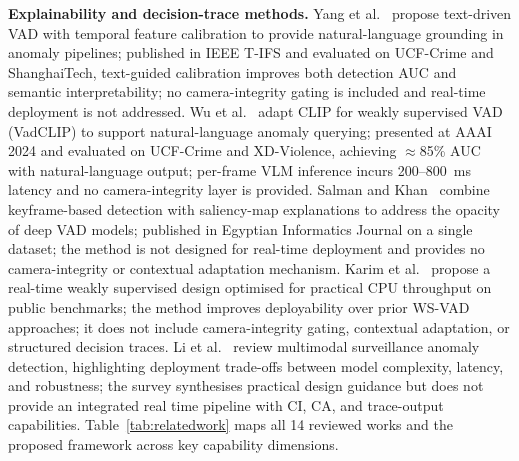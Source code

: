 \documentclass[a4paper,fleqn]{cas-dc}
\begin{document}
\textbf{Explainability and decision-trace methods.}
Yang et al.~\citep{yang2024textvad} propose text-driven VAD with temporal feature calibration to provide natural-language grounding in anomaly pipelines; published in IEEE T-IFS and evaluated on UCF-Crime and ShanghaiTech, text-guided calibration improves both detection AUC and semantic interpretability; no camera-integrity gating is included and real-time deployment is not addressed.
Wu et al.~\citep{wu2024vadclip} adapt CLIP for weakly supervised VAD (VadCLIP) to support natural-language anomaly querying; presented at AAAI 2024 and evaluated on UCF-Crime and XD-Violence, achieving $\approx$85\% AUC with natural-language output; per-frame VLM inference incurs 200--800~ms latency and no camera-integrity layer is provided.
Salman and Khan~\citep{salman2025explainable} combine keyframe-based detection with saliency-map explanations to address the opacity of deep VAD models; published in Egyptian Informatics Journal on a single dataset; the method is not designed for real-time deployment and provides no camera-integrity or contextual adaptation mechanism. Karim et al.~\citep{karim2024real} propose a real-time weakly supervised design optimised for practical CPU throughput on public benchmarks; the method improves deployability over prior WS-VAD approaches; it does not include camera-integrity gating, contextual adaptation, or structured decision traces. Li et al.~\citep{li2024multimodal} review multimodal surveillance anomaly detection, highlighting deployment trade-offs between model complexity, latency, and robustness; the survey synthesises practical design guidance but does not provide an integrated real time pipeline with CI, CA, and trace-output capabilities. Table~\ref{tab:relatedwork} maps all 14 reviewed works and the proposed framework across key capability dimensions.
 
\end{document}
